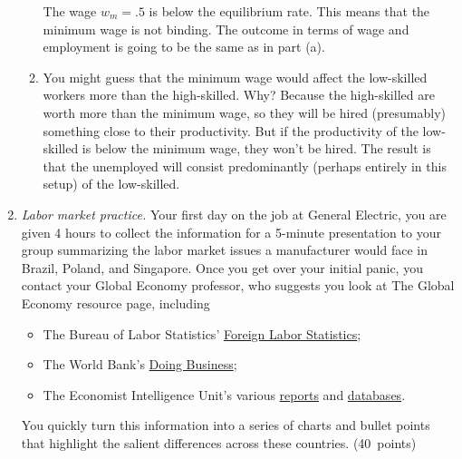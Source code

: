 \documentclass[letterpaper,12pt]{article}
\begin{document}
\begin{enumerate}
\begin{enumerate}

The wage $w_{m}=.5$ is below the equilibrium rate. This means that
the minimum wage is not binding. The outcome in terms of wage and
employment is going to be the same as in part (a).

\item You might guess that the minimum wage would  affect 
the low-skilled workers more than the high-skilled. 
Why?  Because the high-skilled are worth more than the minimum 
wage, so they will be hired (presumably) something close to their 
productivity.
But if the productivity of the low-skilled is below the minimum wage, 
they won't be hired. 
The result is that the unemployed will consist predominantly 
(perhaps entirely in this setup) of the low-skilled. 

\end{enumerate}


\item {\it Labor market practice.\/}  
Your first day on the job at General Electric, 
you are given 4 hours to collect the information for 
a 5-minute presentation to your group summarizing the 
labor market issues a manufacturer would face in 
Brazil, Poland, and Singapore.    
Once you get over your initial panic, 
you contact your Global Economy professor, who suggests you look at
The Global Economy resource page, including     
%
\begin{itemize}

\item The Bureau of Labor Statistics'
\href{http://www.bls.gov/fls/hcaesupptabtoc.htm}{Foreign Labor Statistics};


\item The World Bank's
\href{http://www.doingbusiness.org/}
{Doing Business};   

\item The Economist Intelligence Unit's various 
\href{http://db.eiu.com/topic_view.asp?pubcode=CP&title=Country+Profile}{reports} 
and 
\href{http://www.countrydata.bvdep.com/cgi/template.dll?product=101&user=ipaddress}
{databases}.  

\end{itemize}
%
You quickly turn this information into a series of charts 
and bullet points 
that highlight the salient differences across these countries.  (40~points) 


\end{enumerate}
\end{document}
